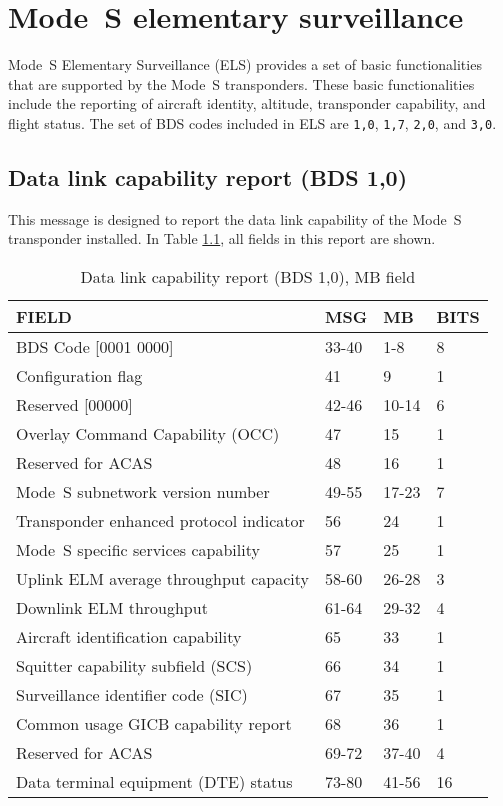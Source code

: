\chapter{Mode~S elementary surveillance}

Mode~S Elementary Surveillance (ELS) provides a set of basic functionalities that are supported by the Mode~S transponders. These basic functionalities include the reporting  of aircraft identity, altitude, transponder capability, and flight status. The set of BDS codes included in ELS are \texttt{1,0}, \texttt{1,7}, \texttt{2,0}, and \texttt{3,0}.

\section{Data link capability report (BDS 1,0)}

This message is designed to report the data link capability of the Mode~S transponder installed. In Table \ref{tb:bds10}, all fields in this report are shown.

\begin{table}[ht]
\centering
\caption{Data link capability report (BDS 1,0), MB field}
\label{tb:bds10}
\begin{tabular}{|l|l|l|l|}
\hline
\textbf{FIELD} & \textbf{MSG} & \textbf{MB} & \textbf{BITS} \\ \hline
BDS Code {[}0001 0000{]} & 33-40 & 1-8 & 8 \\ \hline
Configuration flag & 41 & 9 & 1 \\ \hline
Reserved {[}00000{]} & 42-46 & 10-14 & 6 \\ \hline
Overlay Command Capability (OCC) & 47 & 15 & 1 \\ \hline
Reserved for ACAS & 48 & 16 & 1 \\ \hline
Mode~S subnetwork version number & 49-55 & 17-23 & 7 \\ \hline
Transponder enhanced protocol indicator & 56 & 24 & 1 \\ \hline
Mode~S specific services capability & 57 & 25 & 1 \\ \hline
Uplink ELM average throughput capacity & 58-60 & 26-28 & 3 \\ \hline
Downlink ELM throughput & 61-64 & 29-32 & 4 \\ \hline
Aircraft identification capability & 65 & 33 & 1 \\ \hline
Squitter capability subfield (SCS) & 66 & 34 & 1 \\ \hline
Surveillance identifier code (SIC) & 67 & 35 & 1 \\ \hline
Common usage GICB capability report & 68 & 36 & 1 \\ \hline
Reserved for ACAS & 69-72 & 37-40 & 4 \\ \hline
Data terminal equipment (DTE) status & 73-80 & 41-56 & 16 \\ \hline
\end{tabular}
\end{table}


